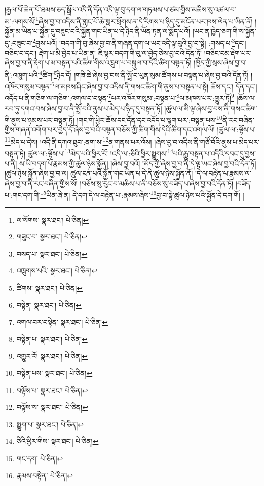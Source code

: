 །རྒྱལ་པོ་ཆེན་པོ་ཐམས་ཅད་སྒྲོལ་འདི་ནི་དོན་འདི་ལྟ་བུ་དག་ལ་གཏམས་པ་ཙམ་གྱིས་མཆིས་སུ་འཚལ་བ་མ་:ལགས་སོ་\footnote{ལ་སོགས་  སྣར་ཐང་།  པེ་ཅིན། }ཞེས་བྱ་བ་འདིས་ནི་གླང་པོ་ཆེ་སླར་ཕྲོགས་ན་དེ་རིགས་པ་ཉིད་དུ་མངོན་པར་ཁས་ལེན་པ་ཡིན་ནོ། །སྐྱོན་མ་ཡིན་པ་སྐྱོན་དུ་བཟུང་བའི་སྐྱོན་གང་ཡིན་པ་དེ་ཉིད་ནི་ཡོན་ཏན་ལ་སྨོད་པའོ། །ཡང་ན་ཁྱེད་ཅག་གི་ས་སྐྱོན་དུ་:བཟུང་བ་\footnote{གཟུང་བ་  སྣར་ཐང་།  པེ་ཅིན། }བྱས་པའོ། །བདག་གི་བུ་ཞེས་བྱ་བ་ནི་གཞན་དག་ལ་ཡང་འདི་ལྟ་བུའི་བྱ་བ་སྟེ། :གསད་པ་\footnote{བསད་པ་  སྣར་ཐང་།  པེ་ཅིན། }དང་། བཅིང་བ་དང་། རྡེག་པ་མི་བྱེད་པ་ཡིན་ན། ཇི་ལྟར་བདག་གི་བུ་ལ་བྱེད་ཅེས་བྱ་བའི་དོན་ཏོ། །བཅིང་ངམ་རྡེག་པར་ཞེས་བྱ་བ་ནི་རྡེག་པ་མ་བསྟན་པའི་ཚིག་གིས་འཁྲུག་པ་བསྐུལ་བ་དེའི་ཚིག་བསྟན་ཏོ། །ཁྱོད་ཀྱི་སྲས་ཞེས་བྱ་བ་ནི་:འཁྲུག་པའི་\footnote{འཁྲུགས་པའི་  སྣར་ཐང་།  པེ་ཅིན། }ཚིག་\footnote{ཚིགས་  སྣར་ཐང་།  པེ་ཅིན། }ཉིད་དོ། །གཟི་ཆེ་ཞེས་བྱ་བས་ནི་སྤྲོ་བ་ཕུན་སུམ་ཚོགས་པ་བསྟན་པ་ཞེས་བྱ་བའི་དོན་ཏོ། །འཁོར་གསུམ་བསྟན་\footnote{བསྟེན་  སྣར་ཐང་།  པེ་ཅིན། }ལ་མཁས་ཤིང་ཞེས་བྱ་བ་འདིས་ནི་གསང་ཚིག་གི་ནུས་པ་བསྟན་པ་སྟེ། ཆོས་དང་། དོན་དང་། འདོད་པ་ནི་གཅིག་ལ་གཅིག་:འགལ་བ་བསྟན་\footnote{འགལ་བར་བསྟེན་  སྣར་ཐང་།  པེ་ཅིན། }པར་འཁོར་གསུམ་:བསྟན་པ་\footnote{བསྟེན་པ་  སྣར་ཐང་།  པེ་ཅིན། }ལ་མཁས་པར་:གྱུར་ཏོ།\footnote{འགྱུར་རོ།  སྣར་ཐང་།  པེ་ཅིན། } །ཆོས་ལ་རབ་ཏུ་དགའ་བས་ཞེས་བྱ་བ་ནི་སྤྲོ་བའི་ནུས་པ་མེད་པ་ཉིད་དུ་བསྟན་ཏོ། །ཚུལ་ལ་མི་ལྟ་ཞེས་བྱ་བས་ནི་གསང་ཚིག་གི་ནུས་པ་ཉམས་པར་བསྟན་ཏོ། །གང་གི་ཕྱིར་ཆོས་དང་དོན་དང་འདོད་པ་ལྷག་པར་:བསྟན་པས་\footnote{བསྟེན་པས་  སྣར་ཐང་།  པེ་ཅིན། }ནི་རང་བཞིན་གྱིས་གཞན་འགོག་པར་བྱེད་དོ་ཞེས་བྱ་བའི་བསྟན་བཅོས་ཀྱི་ཚིག་གིས་དེའི་ཚིག་དང་འགལ་ལོ། །ཚུལ་ལ་:ལྟོས་པ་\footnote{བལྟོས་པ་  སྣར་ཐང་།  པེ་ཅིན། }མེད་པ་དེས། །འདི་ནི་དཀའ་ཐུབ་:ནག་ས་\footnote{བལྟོས་ས་  སྣར་ཐང་།  པེ་ཅིན། }ན་གནས་པར་འོས། །ཞེས་བྱ་བ་འདིས་ནི་གཙོ་བོའི་ནུས་པ་མེད་པར་བསྟན་ཏེ། ཚུལ་ལ་:ལྟོས་པ་\footnote{སྤྱུག་པ་  སྣར་ཐང་།  པེ་ཅིན། }མེད་པའི་ཕྱིར་རོ། །འདི་ལ་:ཅིའི་ཕྱིར་སྤྱུགས་\footnote{ཅིའི་ཕྱིར་གིས་  སྣར་ཐང་།  པེ་ཅིན། }པའི་རྒྱུ་བསྟན་པ་འདིའི་དབང་དུ་བྱས་པ་ནི། ས་ཡི་བདག་པོ་རྣམས་ཀྱི་ཚུལ་ཉེས་སྐྱོན། །ཞེས་བྱ་བའོ། །མོད་ཀྱི་ཞེས་བྱ་བ་ནི་དེ་ལྟ་ཡང་ཞེས་བྱ་བའི་དོན་ཏོ། །ཚུལ་ཉེས་སྐྱོན་ཞེས་བྱ་བ་ལ། ཚུལ་ངན་པའི་སྐྱོན་གང་ཡིན་པ་དེ་ནི་ཚུལ་ཉེས་སྐྱོན་ནོ། །དེ་ལ་བརྟེན་པ་རྣམས་ལ་ཞེས་བྱ་བ་ནི་རང་བཞིན་གྱིས་སོ། །བཅོས་སུ་རུང་བ་མཆིས་པ་ནི་བཅོས་སུ་བཟོད་པ་ཞེས་བྱ་བའི་དོན་ཏོ། །བཟོད་པ་:གང་དག་གི་\footnote{གང་དག་  པེ་ཅིན། }ཡིན་ཞེ་ན། དེ་དག་དེ་ལ་བརྟེན་པ་:རྣམས་ཞེས་\footnote{རྣམས་བསྟེན་  པེ་ཅིན། }བྱ་བ་སྟེ་ཚུལ་ཉེས་པའི་སྐྱོན་དེ་དག་གོ། །
